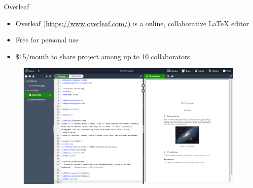 {

 

\begin{frame}{Overleaf}
  \begin{itemize}
    \item \alert{Overleaf} (\url{https://www.overleaf.com/}) is a online, collaborative LaTeX editor
    \item Free for personal use
    \item \$15/month to share project among up to 10 collaborators
  \end{itemize}

  \begin{figure}
    \centering
    \includegraphics[width=.7\linewidth]{./figs/overleaf.png}
  \end{figure}
\end{frame}

}


